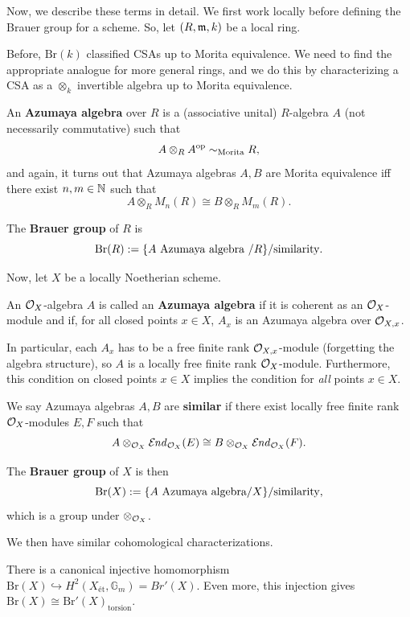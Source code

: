 \documentclass[12pt]{article}
\newcommand{\et}{\text{\'{e}t}}
\newcommand{\G}{\mathbb{G}}
\newcommand{\Br}{\mathrm{Br}}
\begin{document}
Now, we describe these terms in detail. We first work locally before defining the Brauer group for a scheme. So, let $(R,\mathfrak{m},k)$ be a local ring.

Before, $\Br(k)$ classified CSAs up to Morita equivalence. We need to find the appropriate analogue for more general rings, and we do this by characterizing a CSA as a $\otimes_k$ invertible algebra up to Morita equivalence.

\begin{defn}
    An \textbf{Azumaya algebra} over $R$ is a (associative unital) $R$-algebra $A$ (not necessarily commutative) such that
    \[A\otimes_R A^{\mathrm{op}} \sim_{\text{Morita}} R,\]
    and again, it turns out that Azumaya algebras $A,B$ are Morita equivalence iff there exist $n,m\in \mathbb{N}$ such that
    \[A\otimes_R M_n(R) \cong B\otimes_R M_m(R).\]

    The \textbf{Brauer group} of $R$ is
    \[\Br(R) \defeq \{A \text{ Azumaya algebra }/R\}/\text{similarity}.\]
\end{defn}

Now, let $X$ be a locally Noetherian scheme.

\begin{defn}
    An $\mathcal{O}_X$-algebra $A$ is called an \textbf{Azumaya algebra} if it is coherent as an $\mathcal{O}_X$-module and if, for all closed points $x\in X$, $A_x$ is an Azumaya algebra over $\mathcal{O}_{X,x}$.
\end{defn}

\begin{rmk}
    In particular, each $A_x$ has to be a free finite rank $\mathcal{O}_{X,x}$-module (forgetting the algebra structure), so $A$ is a locally free finite rank $\mathcal{O}_X$-module. Furthermore, this condition on closed points $x\in X$ implies the condition for \textit{all} points $x\in X$.
\end{rmk}

\begin{defn}
    We say Azumaya algebras $A,B$ are \textbf{similar} if there exist locally free finite rank $\mathcal{O}_X$-modules $E,F$ such that
    \[A\otimes_{\mathcal{O}_X} \mathcal{E}\kern -1pt \mathit{nd}_{\mathcal{O}_X}(E) \cong B \otimes_{\mathcal{O}_X} \mathcal{E}\kern -1pt \mathit{nd}_{\mathcal{O}_X}(F).\]

    The \textbf{Brauer group} of $X$ is then
    \[\Br(X) \defeq \{A \text{ Azumaya algebra}/X\}/\text{similarity},\]
    which is a group under $\otimes_{\mathcal{O}_X}$.
\end{defn}

We then have similar cohomological characterizations.

\begin{thm}
    There is a canonical injective homomorphism $\Br(X) \hookrightarrow H^2(X_\et, \G_m)=Br'(X)$. Even more, this injection gives $\Br(X) \cong \Br'(X)_{\text{torsion}}$.
\end{thm}
\end{document}
